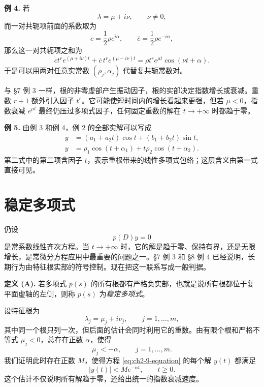 \noindent\textbf{例 4.}
若
\[
 \lambda=\mu+i\nu,
 \qquad \nu\ne0,
\]
而一对共轭项前面的系数取为
\[
 c=\frac12\rho e^{i\alpha},
 \qquad
 \overline c=\frac12\rho e^{-i\alpha},
\]
那么这一对共轭项之和为
\begin{equation}
 ct^re^{(\mu+i\nu)t}+\overline c\,t^re^{(\mu-i\nu)t}
 =\rho t^re^{\mu t}\cos(\nu t+\alpha).
 \label{eq:ch2-8-real-repeated-term}
\end{equation}
于是可以用两对任意实常数 \((\rho_j,\alpha_j)\) 代替复共轭常数对。

与 §7 例 3 一样，根的非零虚部产生振动因子，根的实部决定指数增长或衰减。重数 \(r+1\) 额外引入因子 \(t^r\)。它可能使短时间内的增长看起来更强，但若 \(\mu<0\)，指数衰减 \(e^{\mu t}\) 最终仍压过多项式因子，任何固定重数的解在 \(t\to+\infty\) 时都趋于零。

\noindent\textbf{例 5.}
由例 3 和例 4，例 2 的全部实解可以写成
\begin{align}
 y&=(a_1+a_2t)\cos t+(b_1+b_2t)\sin t,
 \label{eq:ch2-8-example2-real-rectangular}\\
 y&=\rho_1\cos(t+\alpha_1)+t\rho_2\cos(t+\alpha_2).
 \label{eq:ch2-8-example2-real-polar}
\end{align}
第二式中的第二项含因子 \(t\)，表示重根带来的线性多项式包络；这层含义由第一式直接可见。

\section{稳定多项式}

仍设
\begin{equation}
 p(D)y=0
 \label{eq:ch2-9-equation}
\end{equation}
是常系数线性齐次方程。当 \(t\to+\infty\) 时，它的解是趋于零、保持有界，还是无限增长，是常微分方程应用中最重要的问题之一。§7 例 3 和 §8 例 4 已经说明，长期行为由特征根实部的符号控制。现在把这一联系写成一般判据。

\medskip
\noindent\textbf{定义 (A).}
若多项式 \(p(s)\) 的所有根都有严格负实部，也就是说所有根都位于复平面虚轴的左侧，则称 \(p(s)\) 为\emph{稳定多项式}。

设特征根为
\[
 \lambda_j=\mu_j+i\nu_j,
 \qquad j=1,\ldots,m,
\]
其中同一个根只列一次，但后面的估计会同时利用它的重数。由有限个根和严格不等式 \(\mu_j<0\)，总存在正数 \(\alpha\)，使得
\begin{equation}
 \mu_j<-\alpha,
 \qquad j=1,\ldots,m.
 \label{eq:ch2-9-negative-spectral-gap}
\end{equation}
我们证明此时存在正数 \(M\)，使得方程 \eqref{eq:ch2-9-equation} 的每个解 \(y(t)\) 都满足
\begin{equation}
 |y(t)|<Me^{-\alpha t},
 \qquad t\ge0.
 \label{eq:ch2-9-exponential-estimate}
\end{equation}
这个估计不仅说明所有解趋于零，还给出统一的指数衰减速度。

